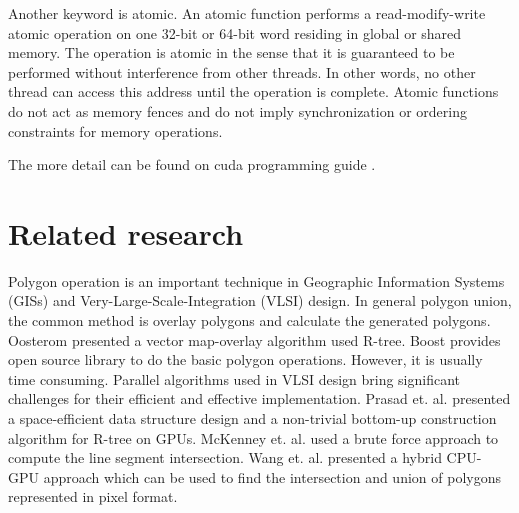 Another keyword is atomic. An atomic function performs a read-modify-write atomic operation on one 32-bit or 64-bit word residing in global or shared memory. The operation is atomic in the sense that it is guaranteed to be performed without interference from other threads. In other words, no other thread can access this address until the operation is complete. Atomic functions do not act as memory fences and do not imply synchronization or ordering constraints for memory operations.

The more detail can be found on cuda programming guide \cite{cuda_programming_guide}.

\section{Related research}
Polygon operation is an important technique in Geographic Information Systems (GISs) and Very-Large-Scale-Integration (VLSI) design. In general polygon union, the common method is overlay polygons and calculate the generated polygons. Oosterom \cite{Peter:1994} presented a vector map-overlay algorithm used R-tree. Boost \cite{Simonson2009GeometryTL} \cite{Schling:2011:BCL:2049814} provides open source library to do the basic polygon operations. However, it is usually time consuming. Parallel algorithms used in VLSI design bring significant challenges for their efficient and effective implementation. Prasad et. al. \cite{Prasad:2015:GPR:2863697.2864578} presented a space-efficient data structure design and a non-trivial bottom-up construction algorithm for R-tree on GPUs. McKenney et. al. \cite{McKenney:2011:GOC:2093973.2094051} used a brute force approach to compute the line segment intersection. Wang et. al. presented a hybrid CPU-GPU approach which can be used to find the intersection and union of polygons represented in pixel format.

